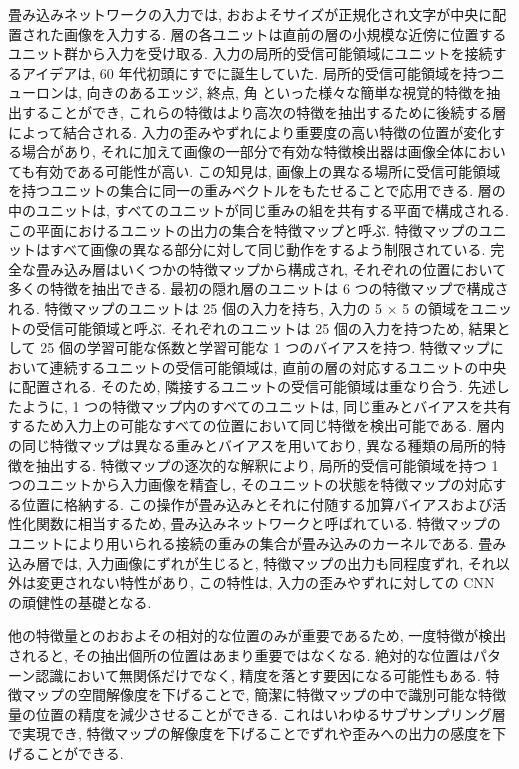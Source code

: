 \documentclass[twocolumn]{jarticle}     %
\begin{document}
 畳み込みネットワークの入力では, おおよそサイズが正規化され文字が中央に配置された画像を入力する. 層の各ユニットは直前の層の小規模な近傍に位置するユニット群から入力を受け取る. 入力の局所的受信可能領域にユニットを接続するアイデアは, 60 年代初頭にすでに誕生していた.
局所的受信可能領域を持つニューロンは, 向きのあるエッジ, 終点, 角 といった様々な簡単な視覚的特徴を抽出することができ, これらの特徴はより高次の特徴を抽出するために後続する層によって結合される. 入力の歪みやずれにより重要度の高い特徴の位置が変化する場合があり, それに加えて画像の一部分で有効な特徴検出器は画像全体においても有効である可能性が高い. この知見は, 画像上の異なる場所に受信可能領域を持つユニットの集合に同一の重みベクトルをもたせることで応用できる.
層の中のユニットは, すべてのユニットが同じ重みの組を共有する平面で構成される. この平面におけるユニットの出力の集合を特徴マップと呼ぶ. 特徴マップのユニットはすべて画像の異なる部分に対して同じ動作をするよう制限されている. 完全な畳み込み層はいくつかの特徴マップから構成され, それぞれの位置において多くの特徴を抽出できる. 最初の隠れ層のユニットは 6 つの特徴マップで構成される. 
特徴マップのユニットは 25 個の入力を持ち, 入力の 5 × 5 の領域をユニットの受信可能領域と呼ぶ. それぞれのユニットは 25 個の入力を持つため, 結果として 25 個の学習可能な係数と学習可能な 1 つのバイアスを持つ. 特徴マップにおいて連続するユニットの受信可能領域は, 直前の層の対応するユニットの中央に配置される.
そのため, 隣接するユニットの受信可能領域は重なり合う. 先述したように, 1 つの特徴マップ内のすべてのユニットは, 同じ重みとバイアスを共有するため入力上の可能なすべての位置において同じ特徴を検出可能である.
層内の同じ特徴マップは異なる重みとバイアスを用いており, 異なる種類の局所的特徴を抽出する. 特徴マップの逐次的な解釈により, 局所的受信可能領域を持つ 1 つのユニットから入力画像を精査し, そのユニットの状態を特徴マップの対応する位置に格納する. 
この操作が畳み込みとそれに付随する加算バイアスおよび活性化関数に相当するため, 畳み込みネットワークと呼ばれている.
 特徴マップのユニットにより用いられる接続の重みの集合が畳み込みのカーネルである. 畳み込み層では, 入力画像にずれが生じると, 特徴マップの出力も同程度ずれ, それ以外は変更されない特性があり, この特性は, 入力の歪みやずれに対しての CNN の頑健性の基礎となる.
\par
他の特徴量とのおおよその相対的な位置のみが重要であるため, 一度特徴が検出されると, その抽出個所の位置はあまり重要ではなくなる. 絶対的な位置はパターン認識において無関係だけでなく, 精度を落とす要因になる可能性もある.
特徴マップの空間解像度を下げることで, 簡潔に特徴マップの中で識別可能な特徴量の位置の精度を減少させることができる. これはいわゆるサブサンプリング層で実現でき, 特徴マップの解像度を下げることでずれや歪みへの出力の感度を下げることができる.
\end{document}
